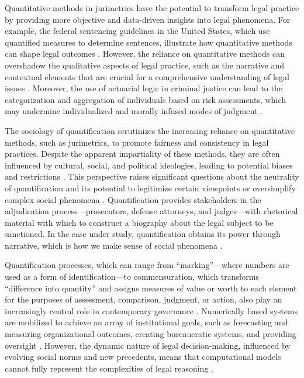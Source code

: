 Quantitative methods in jurimetrics have the potential to transform legal practice by providing more objective and data-driven insights into legal phenomena. For example, the federal sentencing guidelines in the United States, which use quantified measures to determine sentences, illustrate how quantitative methods can shape legal outcomes \cite{101111lsi12334}. However, the reliance on quantitative methods can overshadow the qualitative aspects of legal practice, such as the narrative and contextual elements that are crucial for a comprehensive understanding of legal issues \cite{101111lsi12334}. Moreover, the use of actuarial logic in criminal justice can lead to the categorization and aggregation of individuals based on risk assessments, which may undermine individualized and morally infused modes of judgment \cite{101111lsi12334}.

The sociology of quantification scrutinizes the increasing reliance on quantitative methods, such as jurimetrics, to promote fairness and consistency in legal practices. Despite the apparent impartiality of these methods, they are often influenced by cultural, social, and political ideologies, leading to potential biases and restrictions \cite{10.1057/s41599-020-00557-0, de2010jurimetrics, 10.1177/09596801221075807}. This perspective raises significant questions about the neutrality of quantification and its potential to legitimize certain viewpoints or oversimplify complex social phenomena \cite{10.1111/ilr.12067, 10.20396/rdbci.v18i0.8658889}. Quantification provides stakeholders in the adjudication process—prosecutors, defense attorneys, and judges—with rhetorical material with which to construct a biography about the legal subject to be sanctioned. In the case under study, quantification obtains its power through narrative, which is how we make sense of social phenomena \cite{101111lsi12334}.

Quantification processes, which can range from “marking”—where numbers are used as a form of identification—to commensuration, which transforms “difference into quantity” and assigns measures of value or worth to each element for the purposes of assessment, comparison, judgment, or action, also play an increasingly central role in contemporary governance \cite{101111lsi12334}. Numerically based systems are mobilized to achieve an array of institutional goals, such as forecasting and measuring organizational outcomes, creating bureaucratic systems, and providing oversight \cite{101111lsi12334}. However, the dynamic nature of legal decision-making, influenced by evolving social norms and new precedents, means that computational models cannot fully represent the complexities of legal reasoning \cite{10.1007/s11186-021-09453-1,zabala2019decades}.

